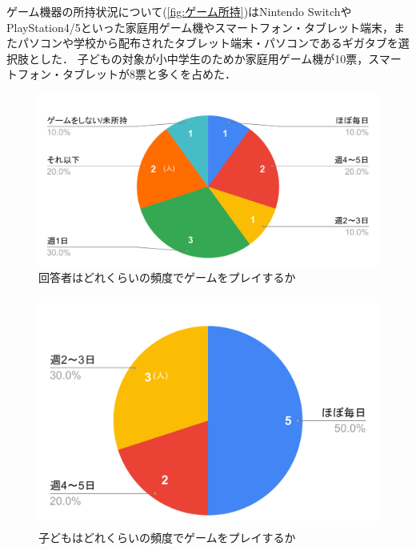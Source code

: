 \documentclass[12pt,a4j,titlepage]{ltjsarticle}
\begin{document}
ゲーム機器の所持状況について(\ref{fig:ゲーム所持})はNintendo SwitchやPlayStation4/5といった家庭用ゲーム機やスマートフォン・タブレット端末，またパソコンや学校から配布されたタブレット端末・パソコンであるギガタブを選択肢とした．
子どもの対象が小中学生のためか家庭用ゲーム機が10票，スマートフォン・タブレットが8票と多くを占めた．

\begin{figure}[H]
 \begin{center}
  \includegraphics[keepaspectratio, scale=0.4]{chart2.pdf}
 \end{center}
 \caption{回答者はどれくらいの頻度でゲームをプレイするか}
 \label{fig:プレイ頻度(回答者)}
\end{figure}

\begin{figure}[H]
 \begin{center}
  \includegraphics[keepaspectratio, scale=0.4]{chart3.pdf}
 \end{center}
 \caption{子どもはどれくらいの頻度でゲームをプレイするか}
 \label{fig:プレイ頻度(子ども)}
\end{figure}
\end{document}
